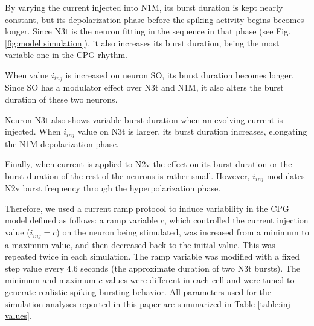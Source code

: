 By varying the current injected into N1M, its burst duration is kept nearly constant, but its depolarization phase before the spiking activity begins becomes longer. Since N3t is the neuron fitting in the sequence in that phase (see Fig. \ref{fig:model simulation}), it also increases its burst duration, being the most variable one in the CPG rhythm. 

When value \(i_{inj}\) is increased on neuron SO, its burst duration becomes longer. Since SO has a modulator effect over N3t and N1M, it also alters the burst duration of these two neurons.

Neuron N3t also shows variable burst duration when an evolving current is injected. When \(i_{inj}\) value on N3t is larger, its burst duration increases, elongating the N1M depolarization phase.  

Finally, when current is applied to N2v the effect on its burst duration or the burst duration of the rest of the neurons is rather small. However, \(i_{inj}\) %
modulates N2v burst frequency through the hyperpolarization phase. 

Therefore, we used a current ramp protocol to induce variability in the CPG model defined as follows: a ramp variable $c$, which controlled the current injection value ($i_{inj}=c$) on the neuron being stimulated, was increased from a minimum to a maximum value, and then decreased back to the initial value. This was repeated twice in each simulation. The ramp variable was modified with a fixed step value every 4.6 seconds (the approximate duration of two N3t bursts). The minimum and maximum $c$ values were different in each cell and were tuned to generate realistic spiking-bursting behavior. All parameters used for the simulation analyses reported in this paper are summarized in Table \ref{table:inj values}.

